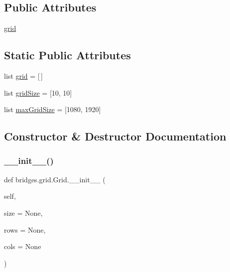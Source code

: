 \subsection*{Public Attributes}
\begin{DoxyCompactItemize}
\item 
\mbox{\hyperlink{classbridges_1_1grid_1_1_grid_a609e662d769bbda34e88dd2be0307f4f}{grid}}
\end{DoxyCompactItemize}
\subsection*{Static Public Attributes}
\begin{DoxyCompactItemize}
\item 
list \mbox{\hyperlink{classbridges_1_1grid_1_1_grid_a149392eaa803dd3639fa584edd458c94}{grid}} = \mbox{[}$\,$\mbox{]}
\item 
list \mbox{\hyperlink{classbridges_1_1grid_1_1_grid_adce099bc682fc79310e90619d791342f}{grid\+Size}} = \mbox{[}10, 10\mbox{]}
\item 
list \mbox{\hyperlink{classbridges_1_1grid_1_1_grid_a5585d466b6738e4eee71a7dda56b4153}{max\+Grid\+Size}} = \mbox{[}1080, 1920\mbox{]}
\end{DoxyCompactItemize}


\subsection{Constructor \& Destructor Documentation}
\mbox{\label{classbridges_1_1grid_1_1_grid_a0c3b42851965c6b4f2e0c69f6b38ab96}} 
\subsubsection{\texorpdfstring{\+\_\+\+\_\+init\+\_\+\+\_\+()}{\_\_init\_\_()}}
{\footnotesize\ttfamily def bridges.\+grid.\+Grid.\+\_\+\+\_\+init\+\_\+\+\_\+ (\begin{DoxyParamCaption}\item[{}]{self,  }\item[{}]{size = {\ttfamily None},  }\item[{}]{rows = {\ttfamily None},  }\item[{}]{cols = {\ttfamily None} }\end{DoxyParamCaption})}




